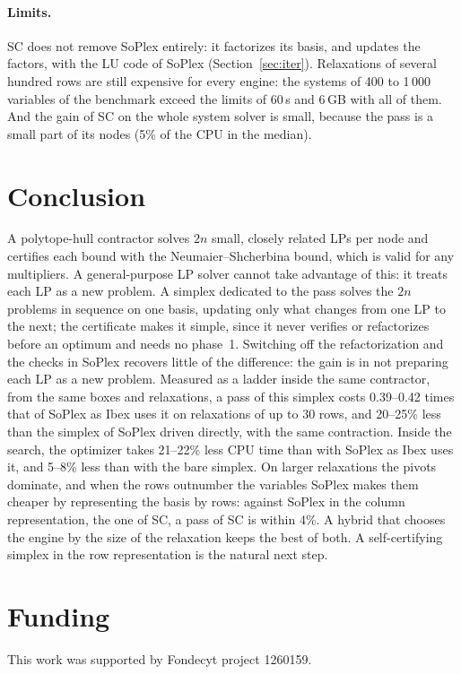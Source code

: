 \documentclass[11pt]{article}
\theoremstyle{definition}
\theoremstyle{remark}
\begin{document}
\paragraph{Limits.} SC does not remove SoPlex entirely: it factorizes its
basis, and updates the factors, with the LU code of SoPlex
(Section~\ref{sec:iter}). Relaxations of several hundred rows are still
expensive for every engine: the systems of 400 to 1\,000 variables of the
benchmark exceed the limits of 60\,s and 6\,GB with all of them. And the gain
of SC on the whole system solver is small, because the pass is a small part of
its nodes (5\% of the CPU in the median).

\section{Conclusion}

A polytope-hull contractor solves $2n$ small, closely related LPs per node and
certifies each bound with the Neumaier--Shcherbina bound, which is valid for
any multipliers. A general-purpose LP solver cannot take advantage of this: it
treats each LP as a new problem. A simplex dedicated to the pass solves the
$2n$ problems in sequence on one basis, updating only what changes from one
LP to the next; the certificate makes it simple, since it never verifies or
refactorizes before an optimum and needs no phase~1. Switching off the
refactorization and the checks in SoPlex recovers little of the difference:
the gain is in not preparing each LP as a new problem. Measured as a ladder
inside the same contractor, from the same boxes and relaxations, a pass of
this simplex costs 0.39--0.42 times that of SoPlex as Ibex uses it on
relaxations of up to 30 rows, and 20--25\% less than the simplex of SoPlex
driven directly, with the same contraction.
Inside the search, the optimizer takes 21--22\% less CPU time than with SoPlex
as Ibex uses it, and 5--8\% less than with the bare simplex. On
larger relaxations the pivots dominate, and when the rows outnumber the
variables SoPlex makes them cheaper by representing the basis by rows:
against SoPlex in the column representation, the one of SC, a pass of SC is
within 4\%. A hybrid that chooses the engine by the size of the relaxation
keeps the best of both. A self-certifying simplex in the row representation
is the natural next step.

\section*{Funding}
This work was supported by Fondecyt project 1260159.
\end{document}

